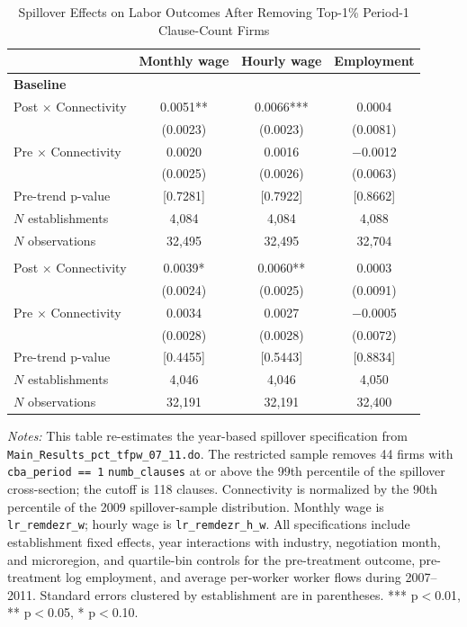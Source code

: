 \begin{table}[!htbp]
\centering
\caption{Spillover Effects on Labor Outcomes After Removing Top-1\% Period-1 Clause-Count Firms}
\label{tab:labor_top1_spillover_results}
\scriptsize
\begin{tabular}{lccc}
\toprule
 & Monthly wage & Hourly wage & Employment \\
\midrule
\multicolumn{4}{l}{\textbf{Baseline}}\\
Post $\times$ Connectivity & 0.0051** & 0.0066*** & 0.0004\\
 & (0.0023) & (0.0023) & (0.0081)\\
Pre $\times$ Connectivity & 0.0020 & 0.0016 & $-$0.0012\\
 & (0.0025) & (0.0026) & (0.0063)\\
Pre-trend p-value & [0.7281] & [0.7922] & [0.8662]\\
$N$ establishments & 4{,}084 & 4{,}084 & 4{,}088\\
$N$ observations & 32{,}495 & 32{,}495 & 32{,}704\\
\addlinespace
\multicolumn{4}{l}{\textbf{Drop top-1\% period-1 clause-count firms}}\\
Post $\times$ Connectivity & 0.0039* & 0.0060** & 0.0003\\
 & (0.0024) & (0.0025) & (0.0091)\\
Pre $\times$ Connectivity & 0.0034 & 0.0027 & $-$0.0005\\
 & (0.0028) & (0.0028) & (0.0072)\\
Pre-trend p-value & [0.4455] & [0.5443] & [0.8834]\\
$N$ establishments & 4{,}046 & 4{,}046 & 4{,}050\\
$N$ observations & 32{,}191 & 32{,}191 & 32{,}400\\
\bottomrule
\end{tabular}
\begin{minipage}{\linewidth}
\footnotesize\vspace{4pt}
\textit{Notes:} This table re-estimates the year-based spillover specification from \texttt{Main\_Results\_pct\_tfpw\_07\_11.do}. The restricted sample removes 44 firms with \texttt{cba\_period == 1} \texttt{numb\_clauses} at or above the 99th percentile of the spillover cross-section; the cutoff is 118 clauses. Connectivity is normalized by the 90th percentile of the 2009 spillover-sample distribution. Monthly wage is \texttt{lr\_remdezr\_w}; hourly wage is \texttt{lr\_remdezr\_h\_w}. All specifications include establishment fixed effects, year interactions with industry, negotiation month, and microregion, and quartile-bin controls for the pre-treatment outcome, pre-treatment log employment, and average per-worker worker flows during 2007--2011. Standard errors clustered by establishment are in parentheses. *** p$<$0.01, ** p$<$0.05, * p$<$0.10.
\end{minipage}
\end{table}
